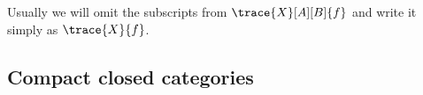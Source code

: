 Usually we will omit the subscripts from \(\trace{X}[A][B]{f}\) and write it
simply as \(\trace{X}{f}\).



\subsection{Compact closed categories}